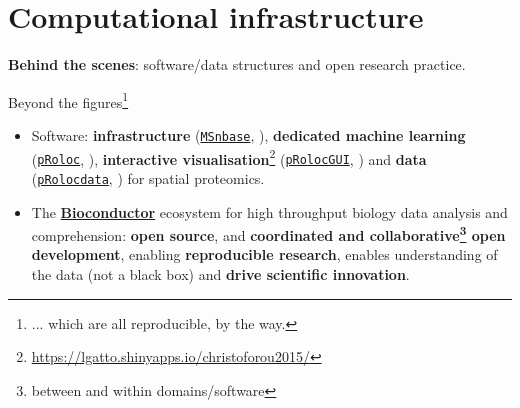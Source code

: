 \section{Computational infrastructure}

\begin{frame}{}
  \begin{center}
    \Large{\textbf{Behind the scenes}: software/data structures and
      open research practice.}
  \end{center}
\end{frame}


\begin{frame}{}

  Beyond the figures\footnote{... which are all reproducible, by the way.}

  \begin{itemize}
  \item<+-> Software: \textbf{infrastructure}
    (\href{http://bioconductor.org/packages/MSnbase}{\texttt{MSnbase}},
    \cite{Gatto:2012}), \textbf{dedicated machine learning}
    (\href{http://bioconductor.org/packages/pRoloc}{\texttt{pRoloc}},
    \cite{Gatto:2014a}), \textbf{interactive
      visualisation}\footnote{\url{https://lgatto.shinyapps.io/christoforou2015/}}
    (\href{http://bioconductor.org/packages/pRolocGUI}{\texttt{pRolocGUI}},
    \cite{pRolocGUI}) and \textbf{data}
    (\href{http://bioconductor.org/packages/pRolocdata}{\texttt{pRolocdata}},
    \cite{Gatto:2014a}) for spatial proteomics.
  \item<+-> The \href{http://bioconductor.org/}{\textbf{Bioconductor}}
    \citep{Huber:2015} ecosystem for high throughput biology data
    analysis and comprehension: \textbf{open source}, and
    \textbf{coordinated and collaborative\footnote{between and within
        domains/software} open development}, enabling
    \textbf{reproducible research}, enables understanding of the data
    (not a black box) and \textbf{drive scientific innovation}.
  \end{itemize}
\end{frame}


